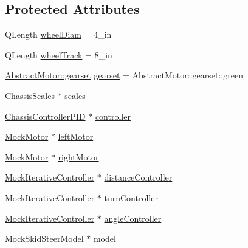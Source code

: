 \subsection*{Protected Attributes}
\begin{DoxyCompactItemize}
\item 
Q\+Length \mbox{\hyperlink{classChassisControllerPIDTest_a306c75f9264b3db5a9bc46706a41b66d}{wheel\+Diam}} = 4\+\_\+in
\item 
Q\+Length \mbox{\hyperlink{classChassisControllerPIDTest_a87b459510245d959a254b884ce3e2235}{wheel\+Track}} = 8\+\_\+in
\item 
\mbox{\hyperlink{classokapi_1_1AbstractMotor_a88aaa6ea2fa10f5520a537bbf26774d5}{Abstract\+Motor\+::gearset}} \mbox{\hyperlink{classChassisControllerPIDTest_a0c94d661705bba3c351580b5a015c99d}{gearset}} = Abstract\+Motor\+::gearset\+::green
\item 
\mbox{\hyperlink{classokapi_1_1ChassisScales}{Chassis\+Scales}} $\ast$ \mbox{\hyperlink{classChassisControllerPIDTest_a07fc477733b447b3fd142ce5bf9be712}{scales}}
\item 
\mbox{\hyperlink{classokapi_1_1ChassisControllerPID}{Chassis\+Controller\+P\+ID}} $\ast$ \mbox{\hyperlink{classChassisControllerPIDTest_a75f0b60ce6169f7e647eda1ac96c68b0}{controller}}
\item 
\mbox{\hyperlink{classokapi_1_1MockMotor}{Mock\+Motor}} $\ast$ \mbox{\hyperlink{classChassisControllerPIDTest_ab39d5a648a7d19b4be9f7e1b9870ef7d}{left\+Motor}}
\item 
\mbox{\hyperlink{classokapi_1_1MockMotor}{Mock\+Motor}} $\ast$ \mbox{\hyperlink{classChassisControllerPIDTest_a7eda98323b8f08235cc27a1f9c59445d}{right\+Motor}}
\item 
\mbox{\hyperlink{classokapi_1_1MockIterativeController}{Mock\+Iterative\+Controller}} $\ast$ \mbox{\hyperlink{classChassisControllerPIDTest_abd35db00316538ab32a587a5f260c91c}{distance\+Controller}}
\item 
\mbox{\hyperlink{classokapi_1_1MockIterativeController}{Mock\+Iterative\+Controller}} $\ast$ \mbox{\hyperlink{classChassisControllerPIDTest_a7ea89fd302d656aff6340d169d0c00c7}{turn\+Controller}}
\item 
\mbox{\hyperlink{classokapi_1_1MockIterativeController}{Mock\+Iterative\+Controller}} $\ast$ \mbox{\hyperlink{classChassisControllerPIDTest_a01eccc48c2f605708e3fbb5801a8e7d9}{angle\+Controller}}
\item 
\mbox{\hyperlink{classokapi_1_1MockSkidSteerModel}{Mock\+Skid\+Steer\+Model}} $\ast$ \mbox{\hyperlink{classChassisControllerPIDTest_aabf7cf541aad0f8d1b19783d02a9433b}{model}}
\end{DoxyCompactItemize}
